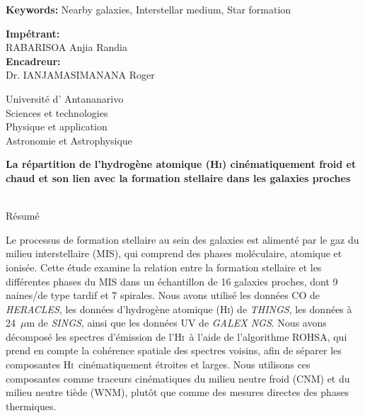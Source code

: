 \documentclass[12pt]{article}
\newcommand{\HI}{\textrm{H\textsc{i}}}
\begin{document}
\vspace{2em}

\noindent
\textbf{Keywords:} 
Nearby galaxies, Interstellar medium, Star formation\\

\newpage	

\pagestyle{empty}
	\begin{minipage}[t]{0.48\textwidth}
		\textbf{Imp\'etrant:} \\
		RABARISOA Anjia Randia \\
		\textbf{Encadreur:}\\
		Dr. IANJAMASIMANANA Roger
		
	\end{minipage}
	\hfill
	\begin{minipage}[t]{0.48\textwidth}
		\raggedleft
		Universit\'e d' Antananarivo\\
		Sciences et technologies\\
		Physique et application\\
		Astronomie et Astrophysique\\
	\end{minipage}
	\vspace{1cm}
	\begin{center}
		\large \parbox{\linewidth}{\centering\fontsize{15}{18}\selectfont\linespread{1}\selectfont\bfseries La répartition de l'hydrogène atomique (\HI) cinématiquement froid et chaud et son lien avec la formation stellaire dans les galaxies proches}\\[1em]
		R\'esum\'e
	\end{center}
	
	\vspace{1em}
	
Le processus de formation stellaire au sein des galaxies est aliment\'e par le gaz du milieu interstellaire (MIS), qui comprend des phases moléculaire, atomique et ionisée. Cette \'etude examine la relation entre la formation stellaire et les diff\'erentes phases du MIS dans un \'echantillon de 16 galaxies proches, dont 9 naines/de type tardif et 7 spirales.
Nous avons utilis\'e les données CO de \textit{HERACLES}, les données d'hydrog\`ene atomique (\HI) de \textit{THINGS}, les donn\'ees à 24~$\mu$m de \textit{SINGS}, ainsi que les donn\'ees UV de \textit{GALEX NGS}.
Nous avons décomposé les spectres d'émission de l'\HI\ à l'aide de l'algorithme ROHSA, qui prend en compte la cohérence spatiale des spectres voisins, afin de séparer les composantes \HI\ cinématiquement étroites et larges. Nous utilisons ces composantes comme traceurs cinématiques du milieu neutre froid (CNM) et du milieu neutre tiède (WNM), plutôt que comme des mesures directes des phases thermiques.
\end{document}
